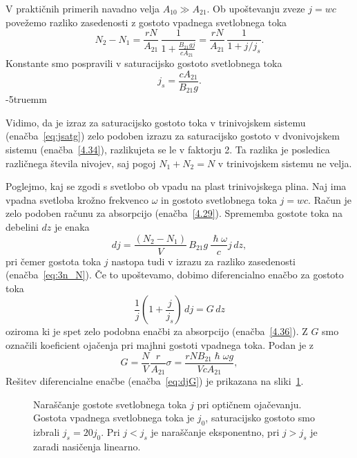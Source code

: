 V praktičnih primerih navadno velja $A_{10}\gg A_{21}$. Ob upoštevanju zveze $j=wc$ povežemo
razliko zasedenosti z gostoto vpadnega svetlobnega toka
\begin{equation}
N_{2}-N_{1}=\frac{rN}{A_{21}} \, \frac{1}{1+\frac{B_{21}gj}{c A_{21}}} = 
\frac{rN}{A_{21}} \, \frac{1}{1+j/j_s}.
\label{eq:3n_N}
\end{equation}
Konstante smo pospravili v saturacijsko gostoto svetlobnega toka 
\begin{equation}
j_s = \frac{c A_{21}}{B_{21}g}.
\label{eq:jsatg}
\end{equation}
\vglue-5truemm
\begin{remark}
 Vidimo, da je  izraz za saturacijsko gostoto toka v trinivojskem sistemu 
 (enačba~\ref{eq:jsatg}) zelo podoben izrazu za saturacijsko gostoto v dvonivojskem
 sistemu (enačba~\ref{4.34}), razlikujeta se le
v faktorju 2. Ta razlika je posledica različnega števila nivojev, saj pogoj $N_{1}+N_{2}=N$
v trinivojskem sistemu ne velja. 
\end{remark}
Poglejmo, kaj se zgodi s svetlobo ob vpadu na plast trinivojskega plina. Naj ima vpadna
svetloba krožno frekvenco $\omega$ in gostoto svetlobnega toka $j=wc$. Račun je zelo podoben 
računu za absorpcijo (enačba~\ref{4.29}). Sprememba gostote toka na debelini $dz$ je enaka
\begin{equation}
dj=\frac{(N_{2}-N_{1})}{V}\, B_{21}g\, \frac{\hslash\omega}{c}j\, dz,
\label{eq:dj}
\end{equation}
pri čemer gostota toka $j$ nastopa tudi v izrazu za razliko
zasedenosti (enačba~\ref{eq:3n_N}). Če to upoštevamo, 
dobimo diferencialno enačbo za gostoto toka
\begin{equation}
\frac{1}{j}\left(1+\frac{j}{j_{s}}\right)\, dj=G\, dz
\label{4.43}
\end{equation}
oziroma
ki je spet zelo podobna enačbi za absorpcijo (enačba~\ref{4.36}).
Z $G$ smo označili koeficient ojačenja pri majhni gostoti vpadnega
toka. Podan je z 
\begin{equation}
G=\frac{N}{V}\frac{r}{A_{21}}\sigma=\frac{rNB_{21}\hslash\omega g}{VcA_{21}},
\label{4.44}
\end{equation}
Rešitev diferencialne enačbe (enačba~\ref{eq:djG}) je prikazana na sliki~\ref{fig:ojacanje}. 
\begin{figure}[h]
\centering
\def\svgwidth{80truemm} 

\caption{Naraščanje gostote svetlobnega toka $j$ pri optičnem ojačevanju. 
Gostota vpadnega svetlobnega toka je $j_0$, saturacijsko
gostoto smo izbrali $j_s = 20 j_0$. Pri $j<j_s$ je naraščanje eksponentno, 
pri $j>j_s$ je zaradi nasičenja linearno.
}
\label{fig:ojacanje}
\end{figure}
